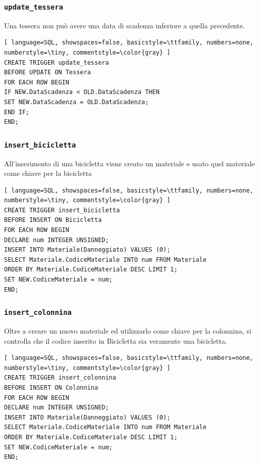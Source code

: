 \documentclass[a4paper,twoside]{article}
\begin{document}
\subsubsection{\texttt{update\_tessera}}
Una tessera non può avere una data di scadenza inferiore a quella precedente.
\begin{lstlisting}[ language=SQL, showspaces=false, basicstyle=\ttfamily, numbers=none, numberstyle=\tiny, commentstyle=\color{gray} ]
CREATE TRIGGER update_tessera
BEFORE UPDATE ON Tessera
FOR EACH ROW BEGIN
IF NEW.DataScadenza < OLD.DataScadenza THEN
SET NEW.DataScadenza = OLD.DataScadenza;
END IF;
END;
\end{lstlisting}
\subsubsection{\texttt{insert\_bicicletta}}
All'inserimento di una bicicletta viene creato un materiale e usato quel materiale come chiave per la bicicletta
\begin{lstlisting}[ language=SQL, showspaces=false, basicstyle=\ttfamily, numbers=none, numberstyle=\tiny, commentstyle=\color{gray} ]
CREATE TRIGGER insert_bicicletta
BEFORE INSERT ON Bicicletta
FOR EACH ROW BEGIN
DECLARE num INTEGER UNSIGNED;
INSERT INTO Materiale(Danneggiato) VALUES (0);
SELECT Materiale.CodiceMateriale INTO num FROM Materiale
ORDER BY Materiale.CodiceMateriale DESC LIMIT 1;
SET NEW.CodiceMateriale = num;
END;
\end{lstlisting}
\subsubsection{\texttt{insert\_colonnina}}
Oltre a creare un nuovo materiale ed utilizzarlo come chiave per la colonnina, si controlla che il codice inserito in Bicicletta sia veramente una bicicletta.
\begin{lstlisting}[ language=SQL, showspaces=false, basicstyle=\ttfamily, numbers=none, numberstyle=\tiny, commentstyle=\color{gray} ]
CREATE TRIGGER insert_colonnina
BEFORE INSERT ON Colonnina
FOR EACH ROW BEGIN
DECLARE num INTEGER UNSIGNED;
INSERT INTO Materiale(Danneggiato) VALUES (0);
SELECT Materiale.CodiceMateriale INTO num FROM Materiale
ORDER BY Materiale.CodiceMateriale DESC LIMIT 1;
SET NEW.CodiceMateriale = num;
END;
\end{lstlisting}
\end{document}
